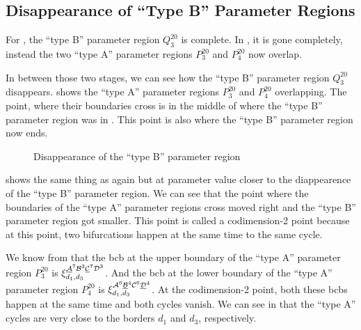 \subsection{Disappearance of ``Type B'' Parameter Regions}
\label{sec:add.change.disb}

For , the ``type B'' parameter region $Q^{20}_3$ is complete.
In , it is gone completely, instead the two ``type A'' parameter regions $P^{20}_3$ and $P^{20}_4$ now overlap.

In between those two stages, we can see how the ``type B'' parameter region $Q^{20}_3$ disappears.
 shows the ``type A'' parameter regions $P^{20}_3$ and $P^{20}_4$ overlapping.
The point, where their boundaries cross is in the middle of where the ``type B'' parameter region was in .
This point is also where the ``type B'' parameter region now ends.

\begin{figure}
	\centering
	\caption{Disappearance of the ``type B'' parameter region}
\end{figure}

 shows the same thing as  again but at parameter value closer to the diappearence of the ``type B'' parameter region.
We can see that the point where the boundaries of the ``type A'' parameter regions cross moved right and the ``type B'' parameter region got smaller.
This point is called a codimension-2 point because at this point, two bifurcations happen at the same time to the same cycle.

We know from  that the \gls{bcb} at the upper boundary of the ``type A'' parameter region $P^{20}_3$ is $\xi_{d_1, d_3}^{\underline{\mathcal{A}}^7\mathcal{B}^3\underline{\mathcal{C}}^7\mathcal{D}^3}$.
And the \gls{bcb} at the lower boundary of the ``type A'' parameter region $P^{20}_4$ is $\xi_{d_1, d_3}^{\mathcal{A}^6\underline{\mathcal{B}}^4\mathcal{C}^6\underline{\mathcal{D}}^4}$.
At the codimension-2 point, both these \glspl{bcb} happen at the same time and both cycles vanish.
We can see in  that the ``type A'' cycles are very close to the borders $d_1$ and $d_3$, respectively.

